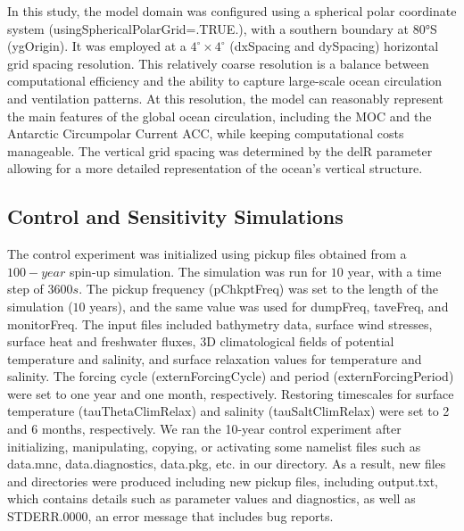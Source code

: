 \documentclass[12pt]{article}
\begin{document}
\noindent In this study, the model domain was configured using a spherical polar coordinate system (usingSphericalPolarGrid=.TRUE.), with a southern boundary at 80°S (ygOrigin). It was employed at a $4 ^{\circ} \times 4 ^{\circ} $ (dxSpacing and dySpacing) horizontal grid spacing resolution. This relatively coarse resolution is a balance between computational efficiency and the ability to capture large-scale ocean circulation and ventilation patterns. At this resolution, the model can reasonably represent the main features of the global ocean circulation, including the MOC and the Antarctic Circumpolar Current ACC, while keeping computational costs manageable. The vertical grid spacing was determined by the delR parameter allowing for a more detailed representation of the ocean's vertical structure. 

\subsection{Control and Sensitivity Simulations}
The control experiment was initialized using pickup files obtained from a $100-year$ spin-up simulation. The simulation was run for $10$ year, with a time step of $3600s$. The pickup frequency (pChkptFreq) was set to the length of the simulation ($10$ years), and the same value was used for dumpFreq, taveFreq, and monitorFreq. The input files included bathymetry data, surface wind stresses, surface heat and freshwater fluxes, 3D climatological fields of potential temperature and salinity, and surface relaxation values for temperature and salinity. The forcing cycle (externForcingCycle) and period (externForcingPeriod) were set to one year and one month, respectively. Restoring timescales for surface temperature (tauThetaClimRelax) and salinity (tauSaltClimRelax) were set to 2 and 6 months, respectively. We ran the 10-year control experiment after initializing, manipulating, copying, or activating some namelist files such as data.mnc, data.diagnostics, data.pkg, etc. in our directory. As a result, new files and directories were produced including new pickup files, including output.txt, which contains details such as parameter values and diagnostics, as well as STDERR.0000, an error message that includes bug reports.\\
\end{document}
